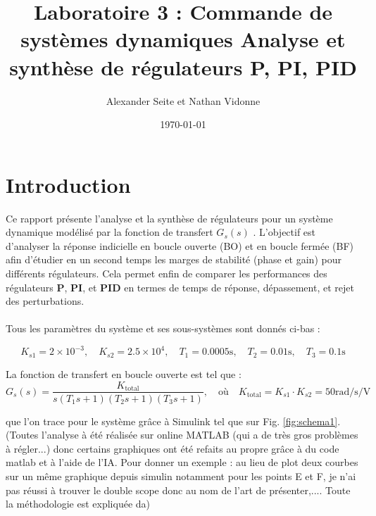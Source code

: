 \documentclass[11pt, a4paper]{article}
\title{
    \textbf{Laboratoire 3 : Commande de systèmes dynamiques} 
    \vspace{0.5cm}
    \large Analyse et synthèse de régulateurs P, PI, PID
}
\author{Alexander Seite et Nathan Vidonne}
\date{\today}
\begin{document}
\maketitle
\newpage

\tableofcontents
\newpage

\section{Introduction}
Ce rapport présente l'analyse et la synthèse de régulateurs pour un système dynamique modélisé par la fonction de transfert  $G_s(s)$ . L'objectif est d'analyser la réponse indicielle en boucle ouverte (BO) et en boucle fermée (BF) afin d'étudier en un second temps les marges de stabilité (phase et gain) pour différents régulateurs. Cela permet enfin de comparer les performances des régulateurs \textbf{P}, \textbf{PI}, et \textbf{PID} en termes de temps de réponse, dépassement, et rejet des perturbations.
\\\\
Tous les paramètres du système et ses sous-systèmes sont donnés ci-bas :

\[
K_{s1} = 2 \times 10^{-3}, \quad K_{s2} = 2.5 \times 10^4, \quad T_1 = 0.0005  \text{s}, \quad T_2 = 0.01  \text{s}, \quad T_3 = 0.1  \text{s}
\]

La fonction de transfert en boucle ouverte est tel que :
\[
G_s(s) = \frac{K_{\text{total}}}{s(T_1 s + 1)(T_2 s + 1)(T_3 s + 1)}, \quad \text{où} \quad K_{\text{total}} = K_{s1} \cdot K_{s2} = 50  \text{rad/s/V}
\]

que l'on trace pour le système grâce à Simulink tel que sur Fig. \ref{fig:schema1}. (Toutes l'analyse à été réalisée sur online MATLAB (qui a de très gros problèmes à régler...) donc certains graphiques ont été refaits au propre grâce à du code matlab et à l'aide de l'IA. Pour donner un exemple : au lieu de plot deux courbes sur un même graphique depuis simulin notamment pour les points E et F, je n'ai pas réussi à trouver le double scope donc au nom de l'art de présenter,.... Toute la méthodologie est expliquée da)
\end{document}
